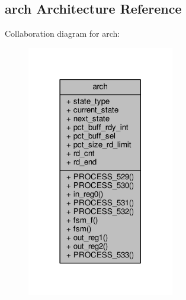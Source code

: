 \subsection{arch Architecture Reference}
\label{classp2d__rd__fsm_1_1arch}


Collaboration diagram for arch\+:\nopagebreak
\begin{figure}[H]
\begin{center}
\leavevmode
\includegraphics[width=182pt]{dc/d94/classp2d__rd__fsm_1_1arch__coll__graph}
\end{center}
\end{figure}
